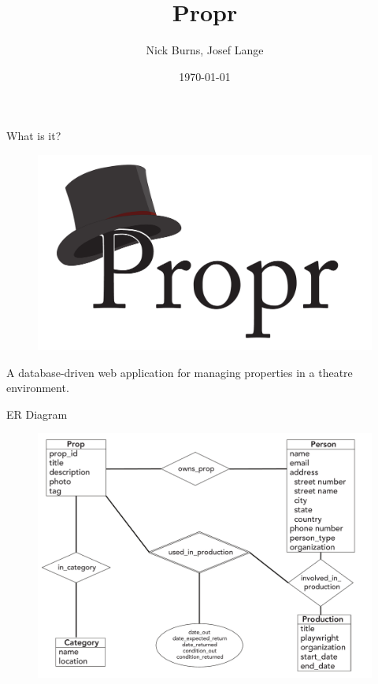 \documentclass{beamer}
\title{Propr}
\author{Nick Burns, Josef Lange}
\institute{University of Puget Sound}
\date{\today}
\begin{document}
\begin{frame}
\titlepage
\end{frame}


\begin{frame}{What is it?}
    \begin{figure}[htb]
        \centering
        \includegraphics[scale=.2]{propr_logo}\\
    \end{figure}
A database-driven web application for managing properties in a theatre environment.
\end{frame}


\begin{frame}{ER Diagram}
    \begin{figure}[htb]
        \centering
        \includegraphics[scale=.3]{ER}
    \end{figure}

\end{frame}
\end{document}

